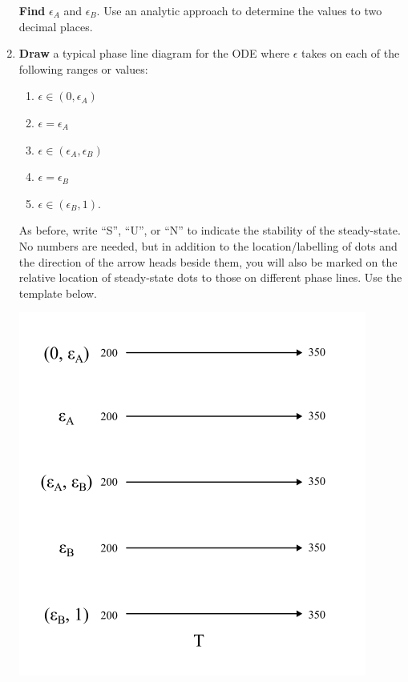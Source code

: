 \documentclass{exam}
\begin{document}
\begin{enumerate}
    \textbf{Find} $\epsilon_A$ and $\epsilon_B$. Use an analytic approach to determine the values to two decimal places.


    \item \textbf{Draw} a typical phase line diagram for the ODE where $\epsilon$ takes on each of the following ranges or values:
    \begin{multicols}{3}
    \begin{enumerate}
        \item $\epsilon \in (0,\epsilon_A)$
        \item $\epsilon = \epsilon_A$
        \item $\epsilon \in (\epsilon_A, \epsilon_B)$
        \item $\epsilon = \epsilon_B$
        \item $\epsilon \in (\epsilon_B, 1)$.
    \end{enumerate}
    \end{multicols}
    As before, write ``S'', ``U'', or ``N'' to indicate the stability of the steady-state. No numbers are needed, but in addition to the location/labelling of dots and the direction of the arrow heads beside them, you will also be marked on the relative location of steady-state dots to those on different phase lines. Use the template below.

    \begin{center}
    \includegraphics[scale=0.7]{math100phaseline2empty.png}
    \end{center}



\end{enumerate}
\end{document}

